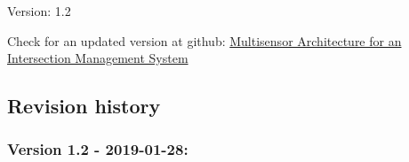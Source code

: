 \begin{titlepage}
    \begin{center}
%   
%        
%		        
%        
%        
%        
%		
%        
Version: 1.2 \\
\vspace{2cm}

      
\end{center}
    
Check for an updated version at github: 
\href{https://github.com/gustavovelascoh/msc-report/wiki}{Multisensor Architecture for an Intersection Management System}


\subsection*{Revision history}
\footnotesize
\subsubsection*{Version 1.2 - 2019-01-28:}


\end{titlepage}
